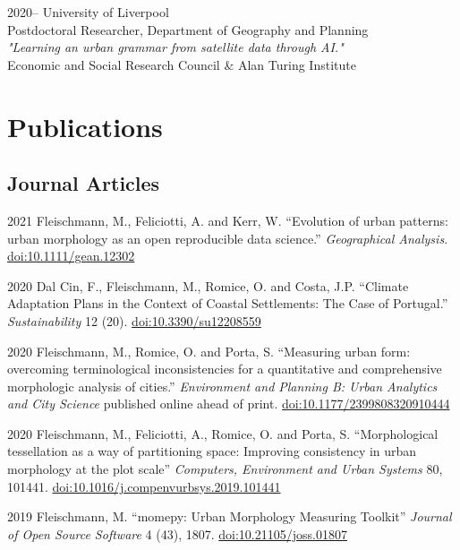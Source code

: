 \documentclass[12pt,a4paper]{report}
\begin{document}
    \begin{tablist}

        \item[2020--] \tab{}University of Liverpool \\
                            Postdoctoral Researcher, Department of Geography and Planning \\
                            \textit{"Learning an urban grammar from satellite data through AI."} \\
                            Economic and Social Research Council \& Alan Turing Institute

    \end{tablist}


    \section*{Publications}

    \subsection*{Journal Articles}

    \begin{tablist}

        \item[2021] \tab{}Fleischmann, M., Feliciotti, A. and Kerr, W. \enquote{Evolution of urban patterns: urban morphology as an open reproducible data science.} \textit{Geographical Analysis}. \href{https://doi.org/10.1111/gean.12302}{doi:10.1111/gean.12302}

        \item[2020] \tab{}Dal Cin, F., Fleischmann, M., Romice, O. and Costa, J.P. \enquote{Climate Adaptation Plans in the Context of Coastal Settlements: The Case of Portugal.} \textit{Sustainability} 12 (20). \href{https://doi.org/10.3390/su12208559}{doi:10.3390/su12208559}

        \item[2020] \tab{}Fleischmann, M., Romice, O. and Porta, S. \enquote{Measuring urban form: overcoming terminological inconsistencies for a quantitative and comprehensive morphologic analysis of cities.} \textit{Environment and Planning B: Urban Analytics and City Science} published online ahead of print. \href{https://doi.org/10.1177/2399808320910444}{doi:10.1177/2399808320910444}

        \item[2020] \tab{}Fleischmann, M., Feliciotti, A., Romice, O. and Porta, S. \enquote{Morphological tessellation as a way of partitioning space: Improving consistency in urban morphology at the plot scale} \textit{Computers, Environment and Urban Systems} 80, 101441. \href{https://doi.org/10.1016/j.compenvurbsys.2019.101441}{doi:10.1016/j.compenvurbsys.2019.101441}

        \item[2019] \tab{}Fleischmann, M. \enquote{momepy: Urban Morphology Measuring Toolkit} \textit{Journal of Open Source Software} 4 (43), 1807. \href{https://doi.org/10.21105/joss.01807}{doi:10.21105/joss.01807}


    \end{tablist}
\end{document}
